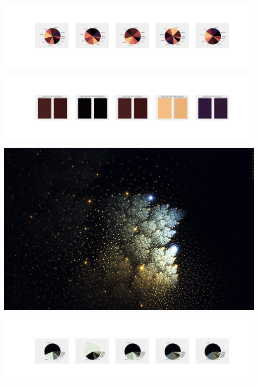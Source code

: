 \documentclass[11pt]{article}
\begin{document}
\begin{landscape}
    \begin{center}
    \includegraphics[width=250mm]{./nbimg/pie-418.jpg}
    \end{center}

    \begin{center}
    \includegraphics[width=250mm]{./nbimg/peak-418.jpg}
    \end{center}
    

    \begin{center}
    \includegraphics[width=\textwidth]{./nbimg/file (70).jpg}
    \end{center}

    \begin{center}
    \includegraphics[width=250mm]{./nbimg/pie-419.jpg}
    \end{center}


\end{landscape}
\end{document}
